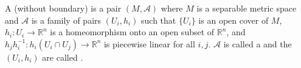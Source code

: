 A  (without boundary) is a pair $(M, \mathcal{A})$ where $M$ is a separable metric space and $\mathcal{A}$ is a family of pairs $(U_i, h_i)$ such that $\{U_i\}$ is an open cover of $M$, $h_i: U_i \to \mathbb{R}^n$ is a homeomorphism onto an open subset of $\mathbb{R}^n$, and $h_j h_i^{-1}: h_i(U_i \cap U_j) \to \mathbb{R}^n$ is piecewise linear for all $i, j$. $\mathcal{A}$ is called a  and the $(U_i, h_i)$ are called .
